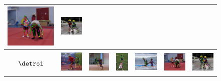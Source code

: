 \begin{figure}
\begin{tabular}{c c c c c c c}
    \includegraphics[height=0.140\linewidth]{imgidx_0568_sticks_mpii_multi.pdf}&
    \includegraphics[height=0.140\linewidth]{imgidx_0804_sticks_mpii_multi.pdf}\\

    \midrule\midrule
    \begin{sideways}\bf \quad\quad$\detroi$\end{sideways}&
    \includegraphics[height=0.140\linewidth]{imgidx_0908_sticks_detroi_mpii_multi.pdf}&
    \includegraphics[height=0.140\linewidth]{imgidx_0104_sticks_detroi_mpii_multi.pdf}&
    \includegraphics[height=0.140\linewidth]{imgidx_1589_sticks_detroi_mpii_multi.pdf}&
    \includegraphics[height=0.140\linewidth]{imgidx_1183_sticks_detroi_mpii_multi.pdf}&
    \includegraphics[height=0.140\linewidth]{imgidx_0568_sticks_detroi_mpii_multi.pdf}&
    \includegraphics[height=0.140\linewidth]{imgidx_0804_sticks_detroi_mpii_multi.pdf}\\

\end{tabular}
\end{figure}
